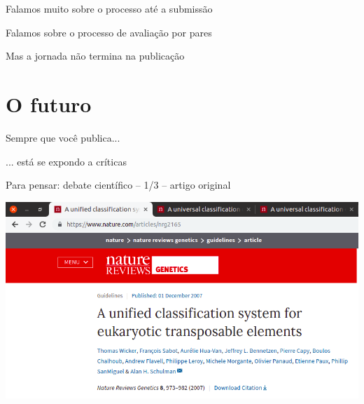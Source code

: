 \documentclass{beamer}
\begin{document}
\begin{frame}
  \begin{center}
    Falamos muito sobre o processo até a submissão

  \end{center}
\end{frame}

\begin{frame}
  \begin{center}
    Falamos sobre o processo de avaliação por pares

  \end{center}
\end{frame}

\begin{frame}
  \begin{center}
    Mas a jornada não termina na publicação

    \vfill
  \end{center}
\end{frame}

\section{O futuro}

\begin{frame}
  \begin{center}
    \Large

    Sempre que você publica...

    \bigskip
    \bigskip
    ... está se expondo a críticas

    \bigskip
    \vfill
  \end{center}
\end{frame}

\begin{frame}{\tiny Para pensar: debate científico -- 1/3 -- artigo original}
  \begin{center}
    \includegraphics[width=\textwidth]{Encerramento/polemica1}
  \end{center}
\end{frame}
\end{document}
